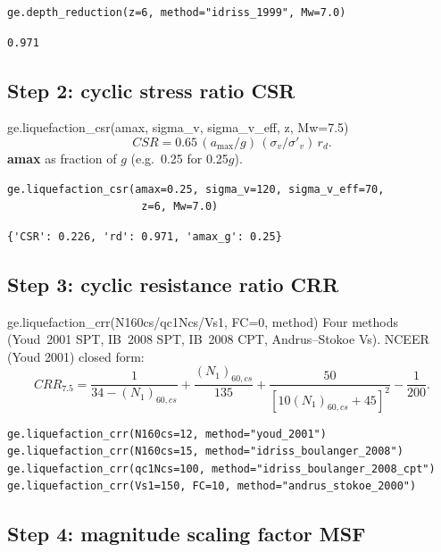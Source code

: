 \documentclass[11pt,a4paper,openany]{book}
\newcommand{\sigmav}{\sigma_v}
\newcommand{\sigmavp}{\sigma'_v}
\begin{document}
\begin{lstlisting}
ge.depth_reduction(z=6, method="idriss_1999", Mw=7.0)
\end{lstlisting}
\begin{lstlisting}[style=output]
0.971
\end{lstlisting}

\subsection{Step 2: cyclic stress ratio CSR}

\begin{funcbox}{ge.liquefaction\_csr(amax, sigma\_v, sigma\_v\_eff, z, Mw=7.5)}
\[
CSR = 0.65\,(a_{\max}/g)\,(\sigmav/\sigmavp)\,r_d.
\]
\textbf{amax} as fraction of $g$ (e.g.\ 0.25 for 0.25$g$).
\end{funcbox}

\begin{lstlisting}
ge.liquefaction_csr(amax=0.25, sigma_v=120, sigma_v_eff=70,
                     z=6, Mw=7.0)
\end{lstlisting}
\begin{lstlisting}[style=output]
{'CSR': 0.226, 'rd': 0.971, 'amax_g': 0.25}
\end{lstlisting}

\subsection{Step 3: cyclic resistance ratio CRR}

\begin{funcbox}{ge.liquefaction\_crr(N160cs/qc1Ncs/Vs1, FC=0, method)}
Four methods (Youd~2001 SPT, IB~2008 SPT, IB~2008 CPT, Andrus--Stokoe Vs).
NCEER (Youd 2001) closed form:
\[
CRR_{7.5} = \frac{1}{34 - (N_1)_{60,cs}}
           + \frac{(N_1)_{60,cs}}{135}
           + \frac{50}{[10(N_1)_{60,cs} + 45]^2}
           - \frac{1}{200}.
\]
\end{funcbox}

\begin{lstlisting}
ge.liquefaction_crr(N160cs=12, method="youd_2001")
ge.liquefaction_crr(N160cs=15, method="idriss_boulanger_2008")
ge.liquefaction_crr(qc1Ncs=100, method="idriss_boulanger_2008_cpt")
ge.liquefaction_crr(Vs1=150, FC=10, method="andrus_stokoe_2000")
\end{lstlisting}

\subsection{Step 4: magnitude scaling factor MSF}
\end{document}
